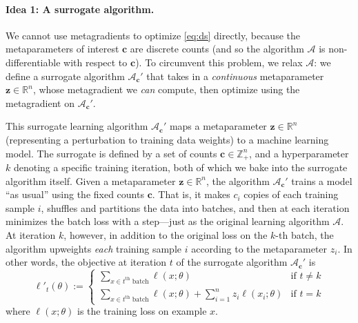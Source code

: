 \paragraph{Idea 1: A surrogate algorithm.} We cannot use metagradients to
optimize \eqref{eq:ds} directly, because the metaparameters of
interest $\mathbf{c}$ are
discrete counts (and so the algorithm $\mathcal{A}$ is non-differentiable with 
respect to $\mathbf{c}$). 
To circumvent this problem, we relax $\mathcal{A}$: we define a surrogate algorithm
$\mathcal{A}_\mathbf{c}'$ that takes in a {\em continuous}
metaparameter $\mathbf{z} \in
\mathbb{R}^n$, whose metagradient we \textit{can} compute, then optimize using
the metagradient on $\mathcal{A}_\mathbf{c}'$.

This surrogate learning algorithm $\mathcal{A}_\mathbf{c}'$ maps a metaparameter 
$\mathbf{z} \in \mathbb{R}^n$ (representing a perturbation to training data weights) 
to a machine learning model.
The surrogate is defined by a set
of counts $\mathbf{c} \in \mathbb{Z}_+^n$, and a hyperparameter $k$ denoting a
specific training iteration, both of which we bake into the surrogate algorithm
itself. 
Given a metaparameter $\mathbf{z} \in \mathbb{R}^n$, the algorithm
$\mathcal{A}_\mathbf{c}'$ trains a model ``as usual'' using the fixed counts
$\mathbf{c}$. That is, it makes $c_i$ copies of each training sample $i$,
shuffles and partitions the data into batches, and then at each iteration
minimizes the batch loss with a step---just as the original learning algorithm
$\mathcal{A}$. At iteration $k$, however, in addition to the original loss on
the $k$-th batch, the algorithm upweights {\em each} training sample $i$
according to the metaparameter $z_i$. In other words, the objective at iteration
$t$ of the surrogate algorithm $\mathcal{A}_\mathbf{c}'$ is
\begin{equation*}
  \label{eq:surrogate_objective}
  \ell'_t(\theta) :=
  \begin{cases}
    \sum_{x \in t^{\text{th}} \text{ batch}} \ell(x; \theta) &
    \!\!\text{if } t \neq k \\
    \sum_{x \in t^{\text{th}} \text{ batch}} \ell(x; \theta) +
    \sum_{i=1}^n z_i \ell(x_i; \theta) &\!\!\text{if } t = k
  \end{cases}
\end{equation*}
where $\ell(x; \theta)$ is the training loss on example $x$.

